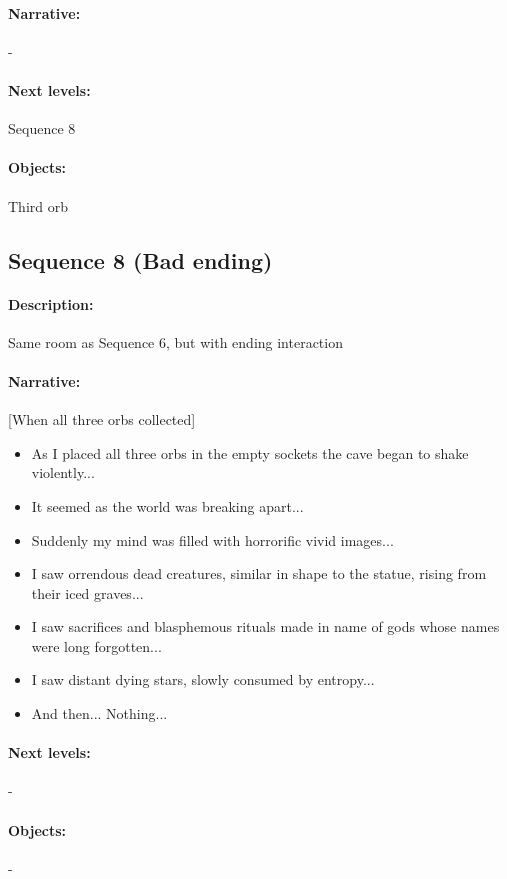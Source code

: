 \documentclass{article}
\begin{document}
\paragraph{Narrative: } -
\paragraph{Next levels: } Sequence 8
\paragraph{Objects: } Third orb

\subsection{Sequence 8 (Bad ending)}

\paragraph{Description: } Same room as Sequence 6, but with ending interaction
\paragraph{Narrative: }
[When all three orbs collected]
\begin{itemize}
\item As I placed all three orbs in the empty sockets the cave began to shake violently...
\item It seemed as the world was breaking apart...
\item Suddenly my mind was filled with horrorific vivid images...
\item I saw orrendous dead creatures, similar in shape to the statue, rising from their iced graves...
\item I saw sacrifices and blasphemous rituals made in name of gods whose names were long forgotten...
\item I saw distant dying stars, slowly consumed by entropy...
\item And then... Nothing...
\end{itemize}
\paragraph{Next levels: } -
\paragraph{Objects: } -
\end{document}

